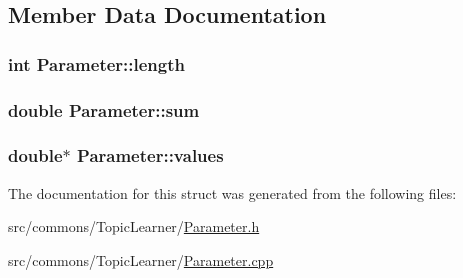 \subsection{Member Data Documentation}
\hypertarget{struct_parameter_ad700759feb1ec5b3e03edf7adf375e29}{
\subsubsection[{length}]{\setlength{\rightskip}{0pt plus 5cm}int {\bf Parameter::length}}}
\label{struct_parameter_ad700759feb1ec5b3e03edf7adf375e29}
\hypertarget{struct_parameter_a17e743cd43b792d51b704a0fb596d734}{
\subsubsection[{sum}]{\setlength{\rightskip}{0pt plus 5cm}double {\bf Parameter::sum}}}
\label{struct_parameter_a17e743cd43b792d51b704a0fb596d734}
\hypertarget{struct_parameter_aeb2a5bbab553c19dc910c1d1e19eb73d}{
\subsubsection[{values}]{\setlength{\rightskip}{0pt plus 5cm}double$\ast$ {\bf Parameter::values}}}
\label{struct_parameter_aeb2a5bbab553c19dc910c1d1e19eb73d}


The documentation for this struct was generated from the following files:\begin{DoxyCompactItemize}
\item 
src/commons/TopicLearner/\hyperlink{_parameter_8h}{Parameter.h}\item 
src/commons/TopicLearner/\hyperlink{_parameter_8cpp}{Parameter.cpp}\end{DoxyCompactItemize}
